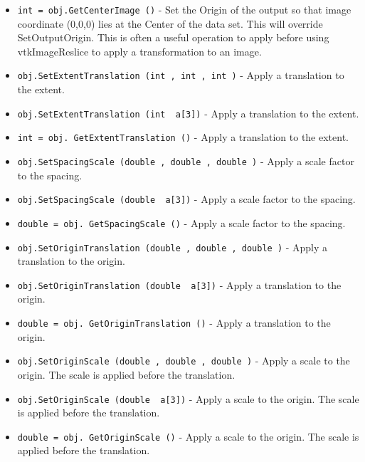 \begin{itemize}
\item  \verb|int = obj.GetCenterImage ()| -  Set the Origin of the output so that image coordinate (0,0,0)
 lies at the Center of the data set.  This will override 
 SetOutputOrigin.  This is often a useful operation to apply 
 before using vtkImageReslice to apply a transformation to an image. 

\item  \verb|obj.SetExtentTranslation (int , int , int )| -  Apply a translation to the extent.

\item  \verb|obj.SetExtentTranslation (int  a[3])| -  Apply a translation to the extent.

\item  \verb|int = obj. GetExtentTranslation ()| -  Apply a translation to the extent.

\item  \verb|obj.SetSpacingScale (double , double , double )| -  Apply a scale factor to the spacing. 

\item  \verb|obj.SetSpacingScale (double  a[3])| -  Apply a scale factor to the spacing. 

\item  \verb|double = obj. GetSpacingScale ()| -  Apply a scale factor to the spacing. 

\item  \verb|obj.SetOriginTranslation (double , double , double )| -  Apply a translation to the origin.

\item  \verb|obj.SetOriginTranslation (double  a[3])| -  Apply a translation to the origin.

\item  \verb|double = obj. GetOriginTranslation ()| -  Apply a translation to the origin.

\item  \verb|obj.SetOriginScale (double , double , double )| -  Apply a scale to the origin.  The scale is applied
 before the translation.

\item  \verb|obj.SetOriginScale (double  a[3])| -  Apply a scale to the origin.  The scale is applied
 before the translation.

\item  \verb|double = obj. GetOriginScale ()| -  Apply a scale to the origin.  The scale is applied
 before the translation.

\end{itemize}
